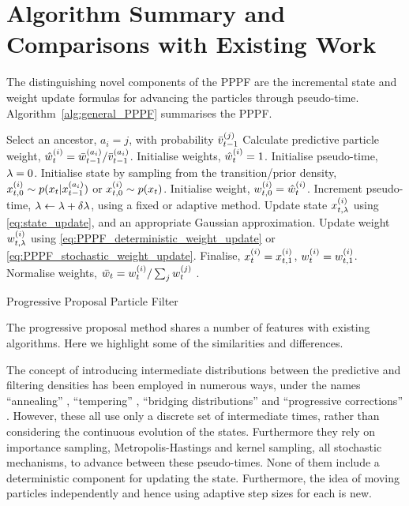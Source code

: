 \documentclass{article}
\begin{document}
\section{Algorithm Summary and Comparisons with Existing Work}

The distinguishing novel components of the PPPF are the incremental state and weight update formulas for advancing the particles through pseudo-time. Algorithm~\ref{alg:general_PPPF} summarises the PPPF.

\begin{algorithm} \label{alg:general_PPPF}
\begin{algorithmic}[1]
        \STATE Select an ancestor, $a_i=j$, with probability $\bar{v}_{t-1}^{(j)}$
        \STATE Calculate predictive particle weight, $\hat{w}_{t}^{(i)} = \bar{w}_{t-1}^{(a_i)} / \bar{v}_{t-1}^{(a_i)}$.
      \ELSE
        \STATE Initialise weights, $\hat{w}_{t}^{(i)} = 1$.
      \ENDIF
      \STATE Initialise pseudo-time, $\lambda=0$.
      \STATE Initialise state by sampling from the transition/prior density, $x_{t,0}^{(i)} \sim p(x_{t} | x_{t-1}^{(a_{i})})$ or $x_{t,0}^{(i)} \sim p(x_{t})$.
      \STATE Initialise weight, $w_{t,0}^{(i)} = \hat{w}_{t}^{(i)}$.
        \STATE Increment pseudo-time, $\lambda \leftarrow \lambda+\delta\lambda$, using a fixed or adaptive method.
        \STATE Update state $x_{t,\lambda}^{(i)}$ using \eqref{eq:state_update}, and an appropriate Gaussian approximation.
        \STATE Update weight $w_{t,\lambda}^{(i)}$ using \eqref{eq:PPPF_deterministic_weight_update} or \eqref{eq:PPPF_stochastic_weight_update}.
      \ENDWHILE
      \STATE Finalise, $x_{t}^{(i)} = x_{t,1}^{(i)}$, $w_{t}^{(i)} = w_{t,1}^{(i)}$.
    \ENDFOR
    \STATE Normalise weights, $\bar{w}_{t} = w_{t}^{(i)} / \sum_j w_{t}^{(j)}$ .
  \ENDFOR
\end{algorithmic}
\caption{Progressive Proposal Particle Filter}
\end{algorithm}

The progressive proposal method shares a number of features with existing algorithms. Here we highlight some of the similarities and differences.

The concept of introducing intermediate distributions between the predictive and filtering densities has been employed in numerous ways, under the names ``annealing'' \citep{Neal2001,Deutscher2000,Gall2007}, ``tempering'' \citep{DelMoral2006}, ``bridging distributions'' \citep{Godsill2001b} and ``progressive corrections'' \citep{Oudjane2000}. However, these all use only a discrete set of intermediate times, rather than considering the continuous evolution of the states. Furthermore they rely on importance sampling, Metropolis-Hastings and kernel sampling, all stochastic mechanisms, to advance between these pseudo-times. None of them include a deterministic component for updating the state. Furthermore, the idea of moving particles independently and hence using adaptive step sizes for each is new.
\end{document}
